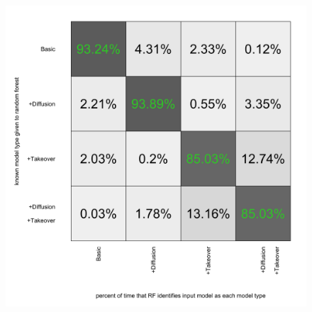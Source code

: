 \documentclass[]{book}
\theoremstyle{definition}
\theoremstyle{definition}
\theoremstyle{definition}
\theoremstyle{remark}
\begin{document}
\begin{figure}
\centering
\includegraphics{confusion_matrix.png}
\caption{}
\end{figure}
\end{document}
